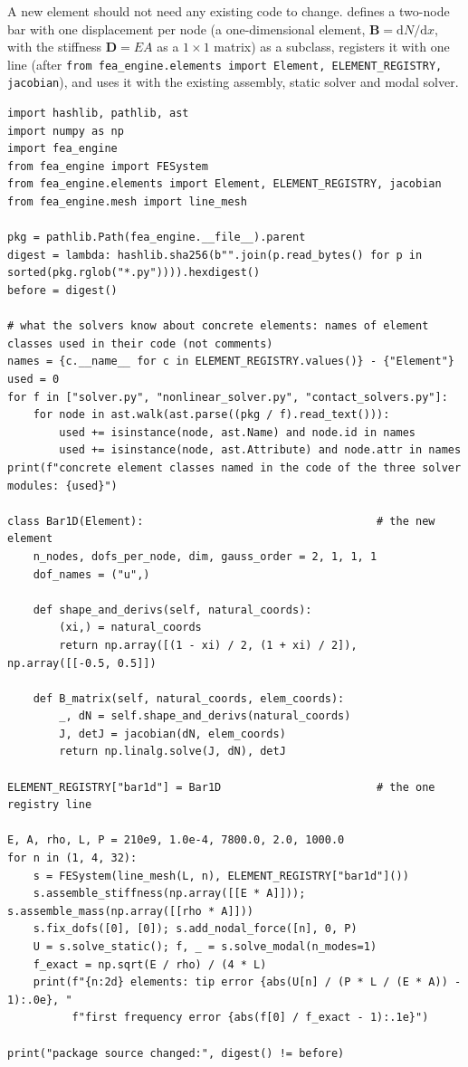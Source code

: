 A new element should not need any existing code to change.  defines a two-node bar with one displacement per node (a one-dimensional element, $\bm B=\mathrm dN/\mathrm dx$, with the stiffness $\bm D=EA$ as a $1\times1$ matrix) as a subclass, registers it with one line (after \texttt{from fea\_engine.elements import Element, ELEMENT\_REGISTRY, jacobian}), and uses it with the existing assembly, static solver and modal solver.

\begin{lstlisting}[caption={A new element by subclassing, the one registry line, and a check that the package was not edited (run with the package on the path).},label={lst:ar-bar}]
import hashlib, pathlib, ast
import numpy as np
import fea_engine
from fea_engine import FESystem
from fea_engine.elements import Element, ELEMENT_REGISTRY, jacobian
from fea_engine.mesh import line_mesh

pkg = pathlib.Path(fea_engine.__file__).parent
digest = lambda: hashlib.sha256(b"".join(p.read_bytes() for p in sorted(pkg.rglob("*.py")))).hexdigest()
before = digest()

# what the solvers know about concrete elements: names of element classes used in their code (not comments)
names = {c.__name__ for c in ELEMENT_REGISTRY.values()} - {"Element"}
used = 0
for f in ["solver.py", "nonlinear_solver.py", "contact_solvers.py"]:
    for node in ast.walk(ast.parse((pkg / f).read_text())):
        used += isinstance(node, ast.Name) and node.id in names
        used += isinstance(node, ast.Attribute) and node.attr in names
print(f"concrete element classes named in the code of the three solver modules: {used}")

class Bar1D(Element):                                    # the new element
    n_nodes, dofs_per_node, dim, gauss_order = 2, 1, 1, 1
    dof_names = ("u",)

    def shape_and_derivs(self, natural_coords):
        (xi,) = natural_coords
        return np.array([(1 - xi) / 2, (1 + xi) / 2]), np.array([[-0.5, 0.5]])

    def B_matrix(self, natural_coords, elem_coords):
        _, dN = self.shape_and_derivs(natural_coords)
        J, detJ = jacobian(dN, elem_coords)
        return np.linalg.solve(J, dN), detJ

ELEMENT_REGISTRY["bar1d"] = Bar1D                        # the one registry line

E, A, rho, L, P = 210e9, 1.0e-4, 7800.0, 2.0, 1000.0
for n in (1, 4, 32):
    s = FESystem(line_mesh(L, n), ELEMENT_REGISTRY["bar1d"]())
    s.assemble_stiffness(np.array([[E * A]])); s.assemble_mass(np.array([[rho * A]]))
    s.fix_dofs([0], [0]); s.add_nodal_force([n], 0, P)
    U = s.solve_static(); f, _ = s.solve_modal(n_modes=1)
    f_exact = np.sqrt(E / rho) / (4 * L)
    print(f"{n:2d} elements: tip error {abs(U[n] / (P * L / (E * A)) - 1):.0e}, "
          f"first frequency error {abs(f[0] / f_exact - 1):.1e}")

print("package source changed:", digest() != before)
\end{lstlisting}

